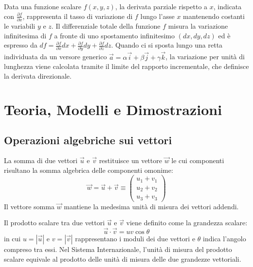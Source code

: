 \documentclass[12pt, a4paper]{article}
\begin{document}
	\begin{tcolorbox}[title=BOX 2: Richiamo di Analisi -- Derivate Parziali, Differenziale Totale e Limiti Direzionali]
		Data una funzione scalare $f(x,y,z)$, la derivata parziale rispetto a $x$, indicata con $\frac{\partial f}{\partial x}$, rappresenta il tasso di variazione di $f$ lungo l'asse $x$ mantenendo costanti le variabili $y$ e $z$. Il differenziale totale della funzione $f$ misura la variazione infinitesima di $f$ a fronte di uno spostamento infinitesimo $(dx, dy, dz)$ ed è espresso da $df = \frac{\partial f}{\partial x}dx + \frac{\partial f}{\partial y}dy + \frac{\partial f}{\partial z}dz$. Quando ci si sposta lungo una retta individuata da un versore generico $\vec{a} = \alpha \vec{i} + \beta \vec{j} + \gamma \vec{k}$, la variazione per unità di lunghezza viene calcolata tramite il limite del rapporto incrementale, che definisce la derivata direzionale.
	\end{tcolorbox}
	
	\section{Teoria, Modelli e Dimostrazioni}
	
	\subsection{Operazioni algebriche sui vettori}
	
	La somma di due vettori $\vec{u}$ e $\vec{v}$ restituisce un vettore $\vec{w}$ le cui componenti risultano la somma algebrica delle componenti omonime:
	\[
	\vec{w} = \vec{u} + \vec{v} \equiv \begin{pmatrix} u_1 + v_1 \\ u_2 + v_2 \\ u_3 + v_3 \end{pmatrix}
	\]
	Il vettore somma $\vec{w}$ mantiene la medesima unità di misura dei vettori addendi.
	
	Il prodotto scalare tra due vettori $\vec{u}$ e $\vec{v}$ viene definito come la grandezza scalare:
	\[
	\vec{u} \cdot \vec{v} = u v \cos\theta
	\]
	in cui $u = |\vec{u}|$ e $v = |\vec{v}|$ rappresentano i moduli dei due vettori e $\theta$ indica l'angolo compreso tra essi. Nel Sistema Internazionale, l'unità di misura del prodotto scalare equivale al prodotto delle unità di misura delle due grandezze vettoriali.
	
\end{document}
